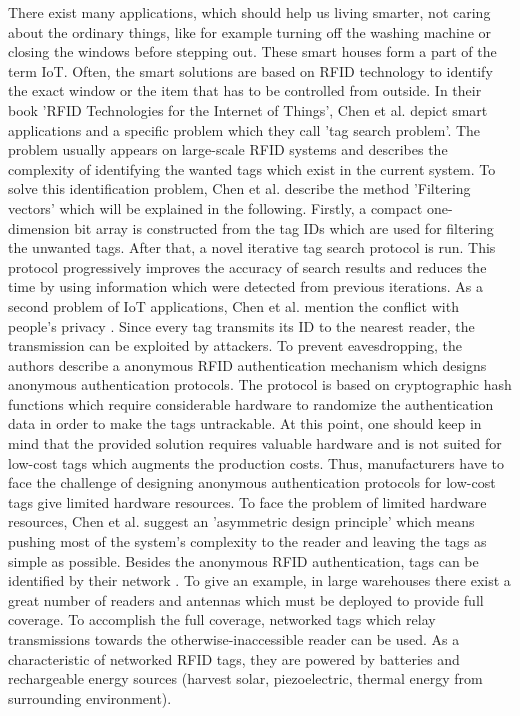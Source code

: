 There exist many applications, which should help us living smarter, not caring about the ordinary things, like for example turning off the washing machine or closing the windows before stepping out. These smart houses form a part of the term \ac{IoT}. Often, the smart solutions are based on RFID technology to identify the exact window or the item that has to be controlled from outside. 
In their book 'RFID Technologies for the Internet of Things', Chen et al. \cite[p.2 f.]{chen} depict smart applications and a specific problem which they call 'tag search problem'. The problem usually appears on large-scale RFID systems and describes the complexity of identifying the wanted tags which exist in the current system. To solve this identification problem, Chen et al. describe the method 'Filtering vectors' which will be explained in the following. 
Firstly, a compact one-dimension bit array is constructed from the tag IDs which are used for filtering the unwanted tags. After that, a novel iterative tag search protocol is run. This protocol progressively improves the accuracy of search results and reduces the time by using information which were detected from previous iterations.
As a second problem of IoT applications, Chen et al. mention the conflict with people's privacy \cite[p.3 f.]{chen}. Since every tag transmits its ID to the nearest reader, the transmission can be exploited by attackers. To prevent eavesdropping, the authors describe a anonymous RFID authentication mechanism which designs anonymous authentication protocols. The protocol is based on cryptographic hash functions which require considerable hardware to randomize the authentication data in order to make the tags untrackable. At this point, one should keep in mind that the provided solution requires valuable hardware and is not suited for low-cost tags which augments the production costs. Thus, manufacturers have to face the challenge of designing anonymous authentication protocols for low-cost tags give limited hardware resources. 
To face the problem of limited hardware resources, Chen et al. suggest an 'asymmetric design principle' \cite[p.4]{chen} which means pushing most of the system's complexity to the reader and leaving the tags as simple as possible. 
Besides the anonymous RFID authentication, tags can be identified by their network \cite[p.4 f.]{chen}. To give an example, in large warehouses there exist a great number of readers and antennas which must be deployed to provide full coverage. To accomplish the full coverage, networked  tags which relay transmissions towards the otherwise-inaccessible reader can be used. As a characteristic of networked RFID tags, they are powered by batteries and rechargeable energy sources (harvest solar, piezoelectric, thermal energy from surrounding environment).
